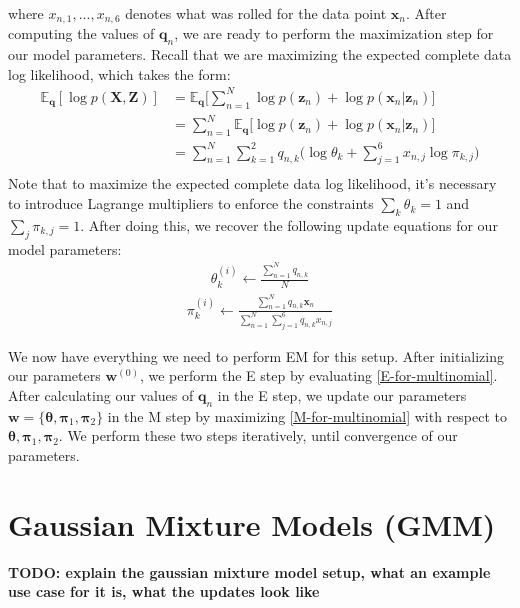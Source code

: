 where $x_{n,1}, ..., x_{n,6}$ denotes what was rolled for the data point $\textbf{x}_n$.
After computing the values of $\textbf{q}_n$, we are ready to perform the maximization step for our model parameters. Recall that we are maximizing the expected complete data log likelihood, which takes the form:
\begin{align} \label{M-for-multinomial}
    \mathbb{E}_{\textbf{q}}[\log p(\textbf{X}, \textbf{Z})] &= \mathbb{E}_{\textbf{q}} \bigg[\sum_{n=1}^{N} \log p(\textbf{z}_n) + \log p(\textbf{x}_n | \textbf{z}_n)\bigg] \\ 
    &= \sum_{n=1}^{N} \mathbb{E}_{\textbf{q}} \bigg[ \log p(\textbf{z}_n) + \log p(\textbf{x}_n | \textbf{z}_n)\bigg] \\ 
    &= \sum_{n=1}^{N} \sum_{k=1}^{2} q_{n, k} \bigg( \log \theta_k + \sum_{j=1}^{6} x_{n, j} \log \pi_{k, j} \bigg) \\ 
\end{align}
Note that to maximize the expected complete data log likelihood, it's necessary to introduce Lagrange multipliers to enforce the constraints $\sum_{k} \theta_k = 1$ and $\sum_{j} \pi_{k, j} = 1$. After doing this, we recover the following update equations for our model parameters:
\begin{align*}
    \theta_{k}^{(i)} \leftarrow \frac{\sum_{n=1}^{N} q_{n, k}}{N}
\end{align*}
\begin{align*}
    \pi_{k}^{(i)} \leftarrow \frac{\sum_{n=1}^{N} q_{n, k} \textbf{x}_{n}}{\sum_{n=1}^{N} \sum_{j=1}^{6} q_{n, k} x_{n, j}}
\end{align*}

We now have everything we need to perform EM for this setup. After initializing our parameters $\textbf{w}^{(0)}$, we perform the E step by evaluating \ref{E-for-multinomial}. After calculating our values of $\textbf{q}_n$ in the E step, we update our parameters $\textbf{w} = \{\boldsymbol{\theta}, \boldsymbol{\pi}_1, \boldsymbol{\pi}_2 \}$ in the M step by maximizing \ref{M-for-multinomial} with respect to $\boldsymbol{\theta}, \boldsymbol{\pi}_1, \boldsymbol{\pi}_2$. We perform these two steps iteratively, until convergence of our parameters.

\section{Gaussian Mixture Models (GMM)}
\textbf{TODO: explain the gaussian mixture model setup, what an example use case for it is, what the updates look like}

